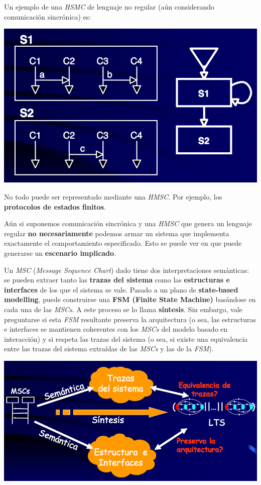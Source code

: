 \documentclass[]{article}
\begin{document}
Un ejemplo de una \textit{HSMC} de lenguaje no regular (aún considerando comunicación sincrónica) es:
\begin{center}
	\includegraphics[scale=0.5]{hmscnoreg.png}
\end{center}


No todo puede ser representado mediante una \textit{HMSC}. Por ejemplo, los \textbf{protocolos de estados finitos}.

Aún si suponemos comunicación sincrónica y una \textit{HMSC} que genera un lenguaje regular \textbf{no necesariamente} podemos armar un sistema que implementa exactamente el comportamiento especificado. Esto se puede ver en que puede generarse un \textbf{escenario implicado}.

Un \textit{MSC} (\textit{Message Sequence Chart}) dado tiene dos interpretaciones semánticas: se pueden extraer tanto las \textbf{trazas del sistema} como las \textbf{estructuras e interfaces} de los que el sistema se vale. Pasado a un plano de \textbf{state-based modelling}, puede construirse una \textbf{FSM (Finite State Machine)} basándose en cada una de las \textit{MSCs}. A este proceso se lo llama \textbf{síntesis}. Sin embargo, vale preguntarse si esta \textit{FSM} resultante preserva la arquitectura (o sea, las estructuras e interfaces se mantienen coherentes con los \textit{MSCs} del modelo basado en interacción) y si respeta las trazas del sistema (o sea, si existe una equivalencia entre las trazas del sistema extraídas de las \textit{MSCs} y las de la \textit{FSM}).

\begin{center}
	\includegraphics[scale=0.45]{InterState.png}
\end{center}
\end{document}
